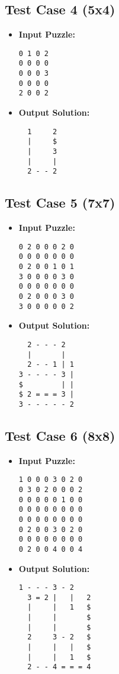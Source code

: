 \subsection{Test Case 4 (5x4)}
\begin{itemize}
    \item \textbf{Input Puzzle:}
    \begin{verbatim}
0 1 0 2
0 0 0 0
0 0 0 3
0 0 0 0
2 0 0 2
    \end{verbatim}
    \item \textbf{Output Solution:}
    \begin{verbatim}
  1     2
  |     $
  |     3
  |     |
  2 - - 2
    \end{verbatim}
\end{itemize}

\subsection{Test Case 5 (7x7)}
\begin{itemize}
    \item \textbf{Input Puzzle:}
    \begin{verbatim}
0 2 0 0 0 2 0
0 0 0 0 0 0 0
0 2 0 0 1 0 1
3 0 0 0 0 3 0
0 0 0 0 0 0 0
0 2 0 0 0 3 0
3 0 0 0 0 0 2
    \end{verbatim}
    \item \textbf{Output Solution:}
    \begin{verbatim}
  2 - - - 2  
  |       |  
  2 - - 1 | 1
3 - - - - 3 |
$         | |
$ 2 = = = 3 |
3 - - - - - 2
    \end{verbatim}
\end{itemize}

\subsection{Test Case 6 (8x8)}
\begin{itemize}
    \item \textbf{Input Puzzle:}
    \begin{verbatim}
1 0 0 0 3 0 2 0
0 3 0 2 0 0 0 2
0 0 0 0 0 1 0 0
0 0 0 0 0 0 0 0
0 0 0 0 0 0 0 0
0 2 0 0 3 0 2 0
0 0 0 0 0 0 0 0
0 2 0 0 4 0 0 4
    \end{verbatim}
    \item \textbf{Output Solution:}
    \begin{verbatim}
1 - - - 3 - 2    
  3 = 2 |   |   2
  |     |   1   $
  |     |       $
  |     |       $
  2     3 - 2   $
  |     |   |   $
  |     |   1   $
  2 - - 4 = = = 4
    \end{verbatim}
\end{itemize}


